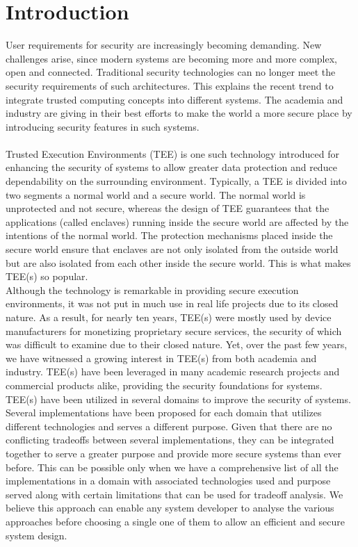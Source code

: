 \documentclass[conference]{IEEEtran}
\begin{document}
\section{Introduction}
User requirements for security are increasingly becoming
demanding. New challenges arise, since modern systems are
becoming more and more complex, open and connected. Traditional security technologies can no longer meet the security
requirements of such architectures. This explains the recent
trend to integrate trusted computing concepts into different
systems. The academia and industry are giving in their best efforts to make the world a more secure place by introducing security features in such systems.\\ \\
Trusted Execution Environments (TEE) is one such technology introduced for enhancing the security of systems to allow greater data protection and reduce dependability on the surrounding environment. Typically, a TEE is divided into two segments a normal world and a secure world. The normal world is unprotected and not secure, whereas the design of TEE guarantees that the applications (called enclaves) running inside the secure world are affected by the intentions of the normal world. The protection mechanisms placed inside the secure world ensure that enclaves are not only isolated from the outside world but are also isolated from each other inside the secure world. This is what makes TEE(s) so popular. \\

Although the technology is remarkable in providing secure execution environments, it was not put in much use in real life projects due to its closed nature. As a result, for
nearly ten years, TEE(s) were mostly used by device manufacturers for monetizing proprietary
secure services, the security of which was difficult to examine due to their closed nature. Yet, over the past few years, we have witnessed a growing interest in TEE(s) from both
academia and industry. TEE(s) have been leveraged in many academic research projects and
commercial products alike, providing the security foundations for systems.\\

TEE(s) have been utilized in several domains to improve the security of systems. Several implementations have been proposed for each domain that utilizes different technologies and serves a different purpose. Given that there are no conflicting tradeoffs between several implementations, they can be integrated together to serve a greater purpose and provide more secure systems than ever before. This can be possible only when we have a comprehensive list of all the implementations in a domain with associated technologies used and purpose served along with certain limitations that can be used for tradeoff analysis. We believe this approach can enable any system developer to analyse the various approaches before choosing a single one of them to allow an efficient and secure system design.\\
\end{document}
